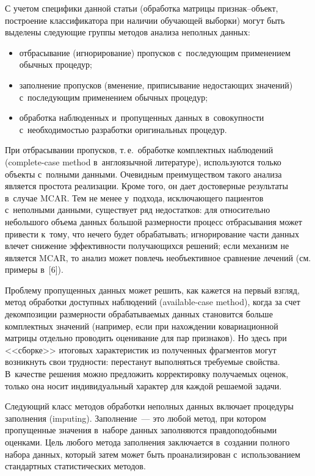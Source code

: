 \begin{multicols}{2}
     С учетом специфики данной статьи (обработка матрицы признак--объ\-ект, построение классификатора при наличии обучающей выборки) могут 
быть выделены следующие группы методов анализа неполных данных:
     \begin{itemize}
\item отбрасывание (игнорирование) пропусков с~последующим применением 
обычных процедур;
\item заполнение пропусков (вменение, приписывание недостающих значений) с~последующим применением обычных процедур;
\item обработка наблюденных и~пропущенных данных в~совокупности с~необходимостью разработки оригинальных процедур.
\end{itemize}

     При отбрасывании пропусков, т.\,е.\ обработке комплектных наблюдений 
(complete-case method в~англоязычной литературе), используются только 
объекты с~полными данными. Очевидным преимуществом такого анализа 
является простота реализации. Кроме того, он дает достоверные результаты 
в~случае MCAR. Тем не менее у~подхода, исклю\-ча\-юще\-го пациентов 
с~неполными данными, существует ряд недостатков: для относительно 
небольшого объема данных большой размерности процесс отбрасывания может 
привести к~тому, что нечего будет обрабатывать; 
игнорирование части данных влечет снижение эффективности по\-лу\-ча\-ющих\-ся 
решений; если механизм не является MCAR, то анализ может повлечь 
необъективное сравнение лечений (см. примеры в~[6]).
     
     Проблему пропущенных данных может решить, как кажется на первый 
взгляд, метод обработки доступных наблюдений (available-case method), когда 
за счет декомпозиции размерности обрабатываемых данных становится больше 
комплектных значений (например, если при нахождении ковариационной 
матрицы отдельно проводить оценивание для пар признаков). Но здесь при 
<<сборке>> итоговых характеристик из полученных фрагментов могут 
возникнуть свои трудности: перестанут выполняться требуемые свойства. 
В~качестве решения можно предложить корректировку получаемых оценок, 
только она носит индивидуальный характер для каждой решаемой задачи. 
     
     Следующий класс методов обработки неполных данных включает 
процедуры заполнения (imputing). Заполнение~--- это любой метод, при 
котором пропущенные значения в~наборе данных заполняются 
правдоподобными оценками. Цель любого метода заполнения заключается 
в~создании полного набора данных, который затем может быть 
проанализирован с~использованием стандартных статистических методов.
     

\end{multicols}

